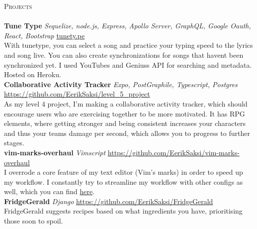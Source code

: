 \documentclass[a4paper]{article}
\newcommand{\lineunder} {
    \vspace*{-8pt} \\
    \hspace*{-18pt} \hrulefill \\
}
\newcommand{\header} [1] {
    {\hspace*{-18pt}\vspace*{6pt} \textsc{#1}}
    \vspace*{-6pt} \lineunder
}
\begin{document}
\header{Projects}
    {\textbf{Tune Type}} {\sl Sequelize, node.js, Express, Apollo Server, GraphQL, Google Oauth, React, Bootstrap} \hfill \url{tunety.pe}\\
With tunetype, you can select a song and practice your typing speed to the lyrics and song live. You can also create synchronizations for songs that haven\textquotesingle{}t been synchronized yet. I used YouTube\textquotesingle{}s and Genius\textquotesingle{}s API for searching and metadata. Hosted on Heroku.\\
\vspace*{2mm}
    {\textbf{Collaborative Activity Tracker}} {\sl Expo, PostGraphile, Typescript, Postgres} \hfill \url{https://github.com/EerikSaksi/level_5_project}\\
As my level 4 project, I'm making a collaborative activity tracker, which should encourage users who are exercising together to be more motivated. It has RPG elements, where getting stronger and being consistent increases your characters and thus your teams damage per second, which allows you to progress to further stages.\\
\vspace*{2mm}
    {\textbf{vim-marks-overhaul}} {\sl Vimscript} \hfill \url{https://github.com/EerikSaksi/vim-marks-overhaul}\\
    I overrode a core feature of my text editor (Vim's marks) in order to speed up my workflow. I constantly try to streamline my workflow with other configs as well, which you can find  \href{https://github.com/EerikSaksi/dotfiles}{here}.  \\
\vspace*{2mm}
    {\textbf{FridgeGerald}} {\sl Django} \hfill \url{https://github.com/EerikSaksi/FridgeGerald}\\
FridgeGerald suggests recipes based on what ingredients you have, prioritising those soon to spoil.\\
\vspace*{2mm}

\ 
\end{document}

